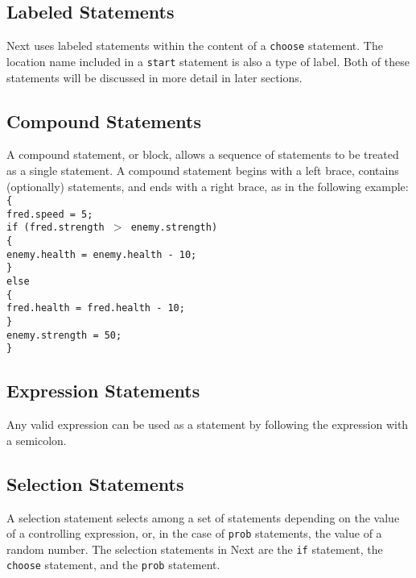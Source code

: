 \documentclass[12pt]{article}
\begin{document}
\subsection{Labeled Statements}
Next uses labeled statements within the content of a \texttt{choose} statement.  The location name included in a \texttt{start} statement is also a type of label.  Both of these statements will be discussed in more detail in later sections.

\subsection{Compound Statements}
A compound statement, or block, allows a sequence of statements to be treated as a single statement.  A compound statement begins with a left brace, contains (optionally) statements, and ends with a right brace, as in the following example: \\

\noindent \texttt{\{ \\
\indent fred.speed = 5; \\
\indent if (fred.strength $>$ enemy.strength) \\
\indent \{ \\
\indent \indent enemy.health = enemy.health - 10;  \\
\indent \} \\
\indent else \\
\indent \{ \\
\indent \indent fred.health = fred.health - 10; \\
\indent \} \\
\indent enemy.strength = 50; \\
\} }

\subsection{Expression Statements}
Any valid expression can be used as a statement by following the expression with a semicolon.

\subsection{Selection Statements}
A selection statement selects among a set of statements depending on the value of a controlling expression, or, in the case of \texttt{prob} statements, the value of a random number.  The selection statements in Next are the \texttt{if} statement, the \texttt{choose} statement, and the \texttt{prob} statement.
\end{document}
